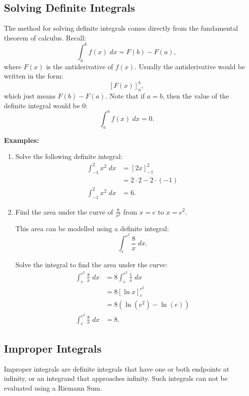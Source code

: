 \documentclass[12pt]{article}
\begin{document}
\subsection{Solving Definite Integrals}
The method for solving definite integrals comes directly from the fundamental theorem of calculus. Recall:
\[ \int_a^b f(x) \; dx = F(b) - F(a), \]
where $F(x)$ is the antiderivative of $f(x)$. Usually the antiderivative would be written in the form:
\[ [F(x)]_a^b, \]
which just means $F(b) - F(a)$. Note that if $a = b$, then the value of the definite integral would be $0$:
\[ \int_a^a f(x) \; dx = 0. \]

\noindent \textbf{Examples:}
\begin{enumerate}
	\item Solve the following definite integral:
	\begin{align*}
		\int_{-1}^2 x^2 \; dx &= [2x]_{-1}^2 \\[5pt]
		&= 2 \cdot 2 - 2 \cdot (-1) \\
		\int_{-1}^2 x^2 \; dx &= 6.
	\end{align*}

	\item Find the area under the curve of $\frac{8}{x^2}$ from $x = e$ to $x = e^2$.

	This area can be modelled using a definite integral:
	\[ \int_e^{e^2} \frac{8}{x} \; dx. \]

	Solve the integral to find the area under the curve:
	\begin{align*}
		\int_e^{e^2} \frac{8}{x} \; dx &= 8 \int_e^{e^2} \frac{1}{x} \; dx \\[5pt]
		&= 8 [\ln x]_e^{e^2} \\
		&= 8 (\ln (e^2) - \ln (e)) \\
		\int_e^{e^2} \frac{8}{x} \; dx &= 8.
	\end{align*}
\end{enumerate}

\subsection{Improper Integrals}
Improper integrals are definite integrals that have one or both endpoints at infinity, or an integrand that approaches infinity. Such integrals can not be evaluated using a Riemann Sum.
\end{document}
